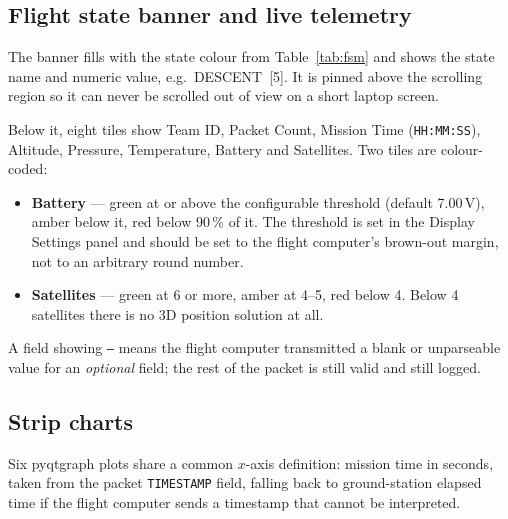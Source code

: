 \documentclass[11pt,a4paper]{article}
\newcommand{\code}[1]{\texttt{#1}}
\begin{document}
\subsection{Flight state banner and live telemetry}

The banner fills with the state colour from Table~\ref{tab:fsm} and shows the
state name and numeric value, e.g.\ \textsf{DESCENT~[5]}. It is pinned above
the scrolling region so it can never be scrolled out of view on a short
laptop screen.

Below it, eight tiles show Team ID, Packet Count, Mission Time
(\code{HH:MM:SS}), Altitude, Pressure, Temperature, Battery and Satellites.
Two tiles are colour-coded:

\begin{itemize}
  \item \textbf{Battery} --- green at or above the configurable threshold
        (default 7.00\,V), amber below it, red below 90\,\% of it. The
        threshold is set in the Display Settings panel and should be set to
        the flight computer's brown-out margin, not to an arbitrary round
        number.
  \item \textbf{Satellites} --- green at 6 or more, amber at 4--5, red below
        4. Below 4 satellites there is no 3D position solution at all.
\end{itemize}

A field showing \code{--} means the flight computer transmitted a blank or
unparseable value for an \emph{optional} field; the rest of the packet is
still valid and still logged.

\subsection{Strip charts}

Six pyqtgraph plots share a common $x$-axis definition: mission time in
seconds, taken from the packet \code{TIMESTAMP} field, falling back to
ground-station elapsed time if the flight computer sends a timestamp that
cannot be interpreted.
\end{document}
